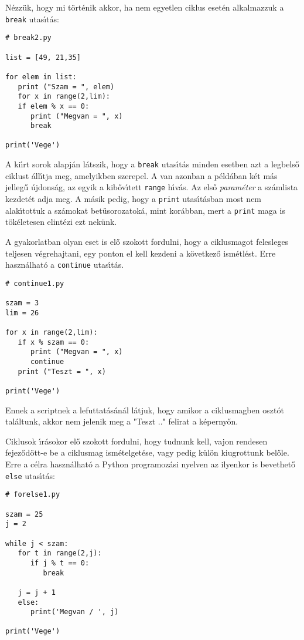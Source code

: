 \documentclass[12pt]{article}
\begin{document}
N\'ezz\"uk, hogy mi t\"ort\'enik akkor, ha nem egyetlen ciklus eset\'en alkalmazzuk a {\tt break} utas\'{\i}t\'as: 

\begin{Verbatim}[fontsize=\small]
# break2.py

list = [49, 21,35]

for elem in list:
   print ("Szam = ", elem)
   for x in range(2,lim):
   if elem % x == 0:
      print ("Megvan = ", x)
      break

print('Vege')
\end{Verbatim}

A ki\'{\i}rt sorok alapj\'an l\'atszik, hogy a {\tt break} utas\'{\i}t\'as minden esetben azt a legbels\H{o} ciklust 
\'all\'{\i}tja meg, amelyikben szerepel. A van azonban a p\'eld\'aban k\'et m\'as jelleg\H{u} \'ujdons\'ag, az egyik a
kib\H{o}v\'{\i}tett {\tt range} h\'{\i}v\'as. Az els\H{o} {\sl param\'eter}  a sz\'amlista kezdet\'et 
adja meg. A m\'asik pedig, hogy a {\tt print} utas\'{\i}t\'asban most nem alak\'{\i}tottuk a sz\'amokat bet\H{u}sorozatok\'a, 
mint kor\'abban, mert a {\tt print} maga is t\"ok\'eletesen elint\'ezi ezt nek\"unk. 

A gyakorlatban olyan eset is el\H{o} szokott fordulni, hogy a ciklusmagot felesleges teljesen v\'egrehaj\-ta\-ni, 
egy ponton el kell kezdeni a k\"ovetkez\H{o} ism\'etl\'est. Erre haszn\'alhat\'o a {\tt continue} utas\'{\i}t\'as. 

\begin{Verbatim}[fontsize=\small]
# continue1.py

szam = 3
lim = 26

for x in range(2,lim):
   if x % szam == 0:
      print ("Megvan = ", x)
      continue
   print ("Teszt = ", x)

print('Vege')   
\end{Verbatim}

Ennek a scriptnek a lefuttat\'as\'an\'al l\'atjuk, hogy amikor a ciklusmagben oszt\'ot tal\'altunk, akkor nem 
jelenik meg a "Teszt .." felirat a k\'eperny\H{o}n. 

Ciklusok \'{\i}r\'asokor el\H{o} szokott fordulni, hogy tudnunk kell, vajon rendesen fejez\H{o}d\"ott-e be a 
ciklusmag ism\'etelget\'ese, vagy pedig k\"ul\"on kiugrottunk bel\H{o}le. Erre a c\'elra haszn\'alhat\'o a 
Python programoz\'asi nyelven az ilyenkor is bevethet\H{o} {\tt else} utas\'{\i}t\'as:

\begin{Verbatim}[fontsize=\small]
# forelse1.py

szam = 25
j = 2

while j < szam:
   for t in range(2,j):
      if j % t == 0:
         break

   j = j + 1
   else:
      print('Megvan / ', j)

print('Vege')   
\end{Verbatim}
\end{document}
